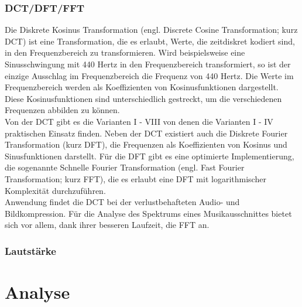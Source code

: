 \documentclass[11pt,a4paper]{article}
\begin{document}
\subsubsection{DCT/DFT/FFT}
Die Diskrete Kosinus Transformation (engl. Discrete Cosine Transformation; kurz DCT) ist eine Transformation, die es erlaubt, Werte, die zeitdiskret kodiert sind, in den Frequenzbereich zu transformieren. Wird beispielsweise eine Sinusschwingung mit 440 Hertz in den Frequenzbereich transformiert, so ist der einzige Ausschlag im Frequenzbereich die Frequenz von 440 Hertz. Die Werte im Frequenzbereich werden als Koeffizienten von Kosinusfunktionen dargestellt. Diese Kosinusfunktionen sind unterschiedlich gestreckt, um die verschiedenen Frequenzen abbilden zu können.\\
Von der DCT gibt es die Varianten I - VIII von denen die Varianten I - IV praktischen Einsatz finden. Neben der DCT existiert auch die Diskrete Fourier Transformation (kurz DFT), die Frequenzen als Koeffizienten von Kosinus und Sinusfunktionen darstellt. Für die DFT gibt es eine optimierte Implementierung, die sogenannte Schnelle Fourier Transformation (engl. Fast Fourier Transformation; kurz FFT), die es erlaubt eine DFT mit logarithmischer Komplexität durchzuführen.\\
Anwendung findet die DCT bei der verlustbehafteten Audio- und Bildkompression. Für die Analyse des Spektrums eines Musikausschnittes bietet sich vor allem, dank ihrer besseren Laufzeit, die FFT an.

\subsubsection{Lautstärke}

\section{Analyse}
\end{document}
